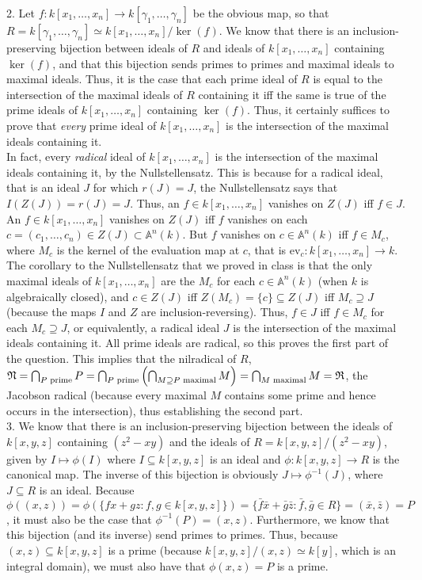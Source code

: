 \documentclass[11pt]{article}
\begin{document}
\num{2.} Let $f:k[x_1,\ldots,x_n]\rightarrow k[\gamma_1,\ldots,\gamma_n]$ be the obvious map, so that $R=k[\gamma_1,\ldots,\gamma_n]\simeq k[x_1,\ldots,x_n]/\ker(f)$. We know that there is an inclusion-preserving bijection between ideals of $R$ and ideals of $k[x_1,\ldots,x_n]$ containing $\ker(f)$, and that this bijection sends primes to primes and maximal ideals to maximal ideals. Thus, it is the case that each prime ideal of $R$ is equal to the intersection of the maximal ideals of $R$ containing it iff the same is true of the prime ideals of $k[x_1,\ldots,x_n]$ containing $\ker(f)$. Thus, it certainly suffices to prove that \textit{every} prime ideal of $k[x_1,\ldots,x_n]$ is the intersection of the maximal ideals containing it.\\

In fact, every \textit{radical} ideal of $k[x_1,\ldots,x_n]$ is the intersection of the maximal ideals containing it, by the Nullstellensatz. This is because for a radical ideal, that is an ideal $J$ for which $r(J)=J$, the Nullstellensatz says that $I(Z(J))=r(J)=J$. Thus, an $f\in k[x_1,\ldots,x_n]$ vanishes on $Z(J)$ iff $f\in J$. An $f\in k[x_1,\ldots,x_n]$ vanishes on $Z(J)$ iff $f$ vanishes on each $c=(c_1,\ldots,c_n)\in Z(J)\subset\mathbb{A}^n(k)$. But $f$ vanishes on $c\in\mathbb{A}^n(k)$ iff $f\in M_c$, where $M_c$ is the kernel of the evaluation map at $c$, that is $\text{ev}_c:k[x_1,\ldots,x_n]\rightarrow k$. The corollary to the Nullstellensatz that we proved in class is that the only maximal ideals of $k[x_1,\ldots,x_n]$ are the $M_c$ for each $c\in\mathbb{A}^n(k)$ (when $k$ is algebraically closed), and $c\in Z(J)$ iff $Z(M_c)=\{c\}\subseteq Z(J)$ iff $M_c\supseteq J$ (because the maps $I$ and $Z$ are inclusion-reversing). Thus, $f\in J$ iff $f\in M_c$ for each $M_c\supseteq J$, or equivalently, a radical ideal $J$ is the intersection of the maximal ideals containing it. All prime ideals are radical, so this proves the first part of the question. This implies that the nilradical of $R$, $\frak{N}=\bigcap_{P\text{ prime}} P=\bigcap_{P\text{ prime}}\left(\bigcap_{M\supseteq P\text{ maximal}} M\right)= \bigcap_{M\text{ maximal}} M=\frak{R}$, the Jacobson radical (because every maximal $M$ contains some prime and hence occurs in the intersection), thus establishing the second part.\\

\num{3.} We know that there is an inclusion-preserving bijection between the ideals of $k[x,y,z]$ containing $(z^2-xy)$ and the ideals of $R=k[x,y,z]/(z^2-xy)$, given by $I\mapsto \phi(I)$ where $I\subseteq k[x,y,z]$ is an ideal and $\phi:k[x,y,z]\rightarrow R$ is the canonical map. The inverse of this bijection is obviously $J\mapsto\phi^{-1}(J)$, where $J\subseteq R$ is an ideal. Because $\phi((x,z))=\phi(\{fx+gz:f,g\in k[x,y,z]\})=\{\bar{f}\bar{x}+\bar{g}\bar{z}:\bar{f},\bar{g}\in R\}=(\bar{x},\bar{z})=P$, it must also be the case that $\phi^{-1}(P)=(x,z)$. Furthermore, we know that this bijection (and its inverse) send primes to primes. Thus, because $(x,z)\subseteq k[x,y,z]$ is a prime (because $k[x,y,z]/(x,z)\simeq k[y]$, which is an integral domain), we must also have that $\phi(x,z)=P$ is a prime. \\
\end{document}

